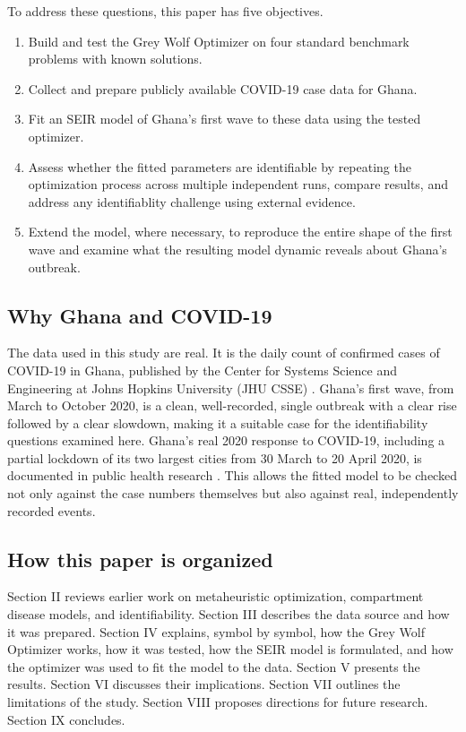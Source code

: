 \documentclass[journal]{IEEEtran}
\begin{document}
To address these questions, this paper has five objectives.

\begin{enumerate}
    \item Build and test the Grey Wolf Optimizer on four standard benchmark problems with known solutions.
    \item Collect and prepare publicly available COVID-19 case data for Ghana.
    \item Fit an SEIR model of Ghana's first wave to these data using the tested optimizer.
    \item  Assess whether the fitted parameters are identifiable by repeating the optimization process across multiple independent runs, compare results, and address any identifiablity challenge using external evidence.
    \item Extend the model, where necessary, to reproduce the entire shape of the first wave and examine what the resulting model dynamic reveals  about Ghana's outbreak.
\end{enumerate}
   

\subsection{Why Ghana and COVID-19}

The data used in this study are real. It is the daily count of confirmed cases of COVID-19 in Ghana, published by the Center for Systems Science and Engineering at Johns Hopkins University (JHU CSSE) \cite{dong2020}. Ghana's first wave, from March to October 2020, is a clean, well-recorded, single outbreak with a clear rise followed by a clear slowdown, making it a suitable case for the identifiability questions examined here. Ghana's real 2020 response to COVID-19, including a partial lockdown of its two largest cities from 30 March to 20 April 2020, is documented in public health research \cite{kenu2020}. This allows the fitted model to be checked not only against the case numbers themselves but also against real, independently recorded events.

\subsection{How this paper is organized}

Section II reviews earlier work on metaheuristic optimization,
compartment disease models, and identifiability. Section III describes the data source and how it was prepared. Section IV explains, symbol by symbol, how the Grey Wolf Optimizer works, how it was tested, how the SEIR model is formulated, and how the optimizer was used to fit the model to the data. Section V presents the results. Section VI discusses their implications. Section VII outlines the limitations
of the study. Section VIII proposes directions for future research. Section IX concludes.
\end{document}
